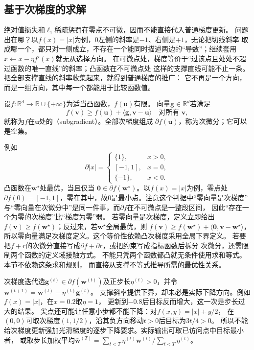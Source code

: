\subsection{基于次梯度的求解}
\label{sec:opt-subgradient-methods}

绝对值损失和$\ell_1$稀疏惩罚在零点不可微，因而不能直接代入普通梯度更新。
问题出在哪？以$f(x)=|x|$为例，$0$左侧的斜率是$-1$、右侧是$+1$，无论把切线斜率
取成哪一个，都只对一侧成立，不存在一个能同时描述两边的“导数”；继续套用
$x\leftarrow x-\eta f'(x)$就无从选择方向。
在可微点处，梯度等价于“过该点且处处不超过函数的唯一直线”的斜率；凸函数在不可微点处
这样的支撑直线可能不止一条。把全部支撑直线的斜率收集起来，就得到普通梯度的推广：
它不再是一个方向，而是一组方向，其中每一个都能用于比较函数值。
\begin{definition}[凸次梯度与次微分]
\label{def:opt-convex-subgradient}
设$f:\mathbb R^d\to\mathbb R\cup\{+\infty\}$为适当凸函数，$f(\bm u)$有限。
向量$\bm{g}\in\mathbb R^d$若满足
\[
  f(\bm{v})\geq f(\bm{u})+\langle\bm{g},\bm{v}-\bm{u}\rangle
  \quad\text{对所有 }\bm{v},
\]
就称为$f$在$\bm{u}$处的（subgradient）。全部次梯度组成
$\partial f(\bm{u})$，称为次微分；它可以是空集。
\end{definition}
例如
\[
  \partial |x|=
  \begin{cases}
    \{1\},&x>0,\\
    [-1,1],&x=0,\\
    \{-1\},&x<0.
  \end{cases}
\]
凸函数在$\bm{w}^{\star}$处最优，当且仅当
$\bm{0}\in\partial f(\bm{w}^{\star})$。以$f(x)=|x|$为例，零点处
$\partial f(0)=[-1,1]$，零在其中，故$0$是最小点。注意这个判据中“零向量是次梯度”
与“零向量在次微分中”是同一件事，而$\partial f$在不可微点是一整段区间，
因此“存在一个为零的次梯度”比“梯度为零”弱。
若零向量是次梯度，定义立即给出
$f(\bm{v})\geq f(\bm{w}^{\star})$；反过来，若$\bm{w}^{\star}$全局最优，则
$f(\bm{v})\geq f(\bm{w}^{\star})+\langle\bm{0},\bm{v}-\bm{w}^{\star}\rangle$，
所以零向量满足次梯度定义。这个等价性依赖凸次梯度采用全局下界定义。
若要把$f+r$的次微分直接写成$\partial f+\partial r$，或把约束写成指标函数后拆分
次微分，还需限制两个函数的定义域接触方式。
不能只凭两个函数都凸就无条件使用求和等式。本节不依赖这条求和规则，
而直接从支撑不等式推导所需的最优性关系。

次梯度迭代选$\bm g^{(t)}\in\partial f(\bm w^{(t)})$及正步长$\eta^{(t)}>0$，并令
$\bm w^{(t+1)}=\bm w^{(t)}-\eta^{(t)}\bm g^{(t)}$。
支撑斜率提供下界，却未必是实际下降方向。例如$f(x)=|x|$，在$x=0.2$取$\eta=1$，
更新到$-0.8$后目标反而增大，这一次是步长过大的结果。
尖点还可能让任意小步都不能下降：对$f(x,y)=|x|+y/2$，
在$(0,0)$可取次梯度$(1,1/2)$，沿其负方向移动$t>0$后目标为$3t/4>0$。
所以不能给次梯度更新强加光滑梯度的逐步下降要求。实际输出可取已访问点中目标最小者，
或取步长加权平均$\bar{\bm w}^{(T)}=\sum_{t<T}\eta^{(t)}\bm w^{(t)}/\sum_{t<T}\eta^{(t)}$。


